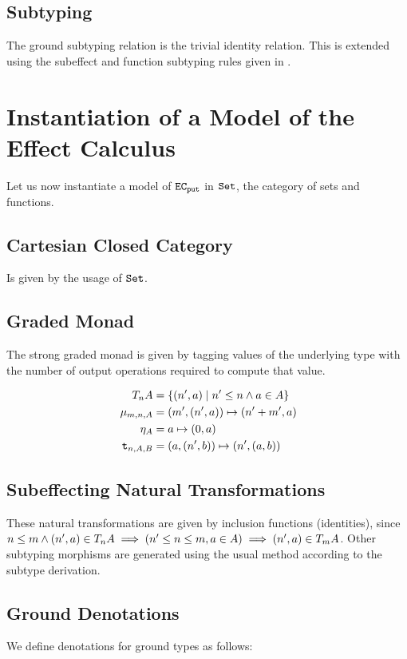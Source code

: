 \documentclass{Report}
\begin{document}
    \subsection{Subtyping}
    The ground subtyping relation is the trivial identity relation. This is extended using the subeffect and function subtyping rules given in .


    \section{Instantiation of a Model of the Effect Calculus}

    Let us now instantiate a model of $\texttt{EC}_{\texttt{put}}$ in $\texttt{Set}$, the category of sets and functions.

    \subsection{Cartesian Closed Category}
    Is given by the usage of $\texttt{Set}$.
    
    \subsection{Graded Monad}
    The strong graded monad is given by tagging values of the underlying type with the number of output operations required to compute that value.

    \begin{align}
        \label{AdequacyGradedMonad}
        T_{n}{A} & = \{(n', a) \mid n'\leq n\wedge a\in A \}\\
        \mu_{m, n, A} & = (m', (n', a))\mapsto (n' + m', a)\\
        \eta_{A} & = a\mapsto (0, a)\\\
        \texttt{t}_{n, A, B} & = (a, (n', b)) \mapsto (n', (a, b))
    \end{align}


\subsection{Subeffecting Natural Transformations}
These natural transformations are given by inclusion functions (identities), since $n\leq m\wedge (n',a)\in T_{n}{A} \implies (n'\leq n \leq m, a\in A)\implies (n',a)\in T_{m}{A}$. Other subtyping morphisms are generated using the usual method according to the subtype derivation.

\subsection{Ground Denotations}
We define denotations for ground types as follows:
\end{document}
